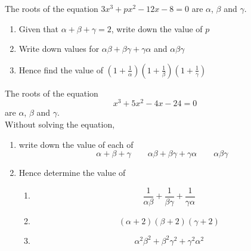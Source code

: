 \documentclass[leqno]{article}
\begin{document}
\djsFrontMatter
\begin{enumerate}[
  label=\textbf{\arabic*.},
  leftmargin=*,
  topsep=0pt,
  partopsep=0pt,
  parsep=0pt
]

\questionitem

The roots of the equation $3x^3 + px^2 - 12x - 8 = 0$ are $\alpha$, $\beta$ and $\gamma$. \\

\begin{enumerate}[label=\textbf{(\alph*)}]
  \item Given that $\alpha + \beta + \gamma = 2$, write down the value of $p$  \\
  \item Write down values for $\alpha\beta + \beta\gamma + \gamma\alpha$ and $\alpha\beta\gamma$  \\
  \item Hence find the value of $\left(1+\frac{1}{\alpha}\right)\left(1+\frac{1}{\beta}\right)\left(1+\frac{1}{\gamma}\right)$  \\
\end{enumerate}

\newpage

\questionitem

The roots of the equation
\[
x^3 + 5x^2 - 4x - 24 = 0
\]
are $\alpha$, $\beta$ and $\gamma$. \\

Without solving the equation,
\begin{enumerate}[label=\textbf{(\alph*)}]
  \item write down the value of each of
  \[
  \alpha + \beta + \gamma \qquad \alpha\beta + \beta\gamma + \gamma\alpha \qquad \alpha\beta\gamma
  \]
  \item Hence determine the value of
  \begin{enumerate}[label=(\roman*)]
    \item \[
    \frac{1}{\alpha\beta} + \frac{1}{\beta\gamma} + \frac{1}{\gamma\alpha}
    \]
    \item \[
    (\alpha + 2)(\beta + 2)(\gamma + 2)
    \]
    \item \[
    \alpha^2\beta^2 + \beta^2\gamma^2 + \gamma^2\alpha^2
    \]
  \end{enumerate}
\end{enumerate}


\end{enumerate}
\end{document}
